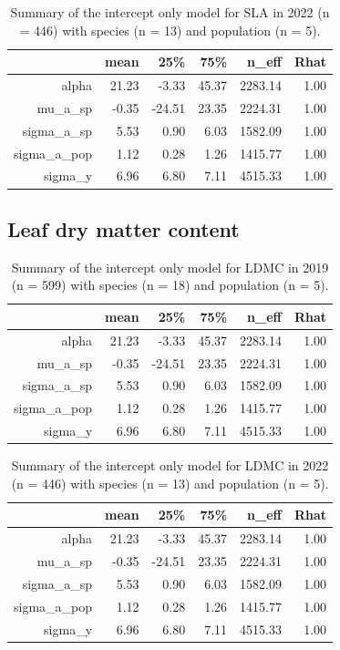 \documentclass{article}
\begin{document}
\begin{table}[ht]
\centering
\caption{Summary of the intercept only model for SLA in 2022 (n = 446) with species (n = 13) and population (n = 5).} 
\begin{tabular}{rrrrrr}
  \hline
 & mean & 25\% & 75\% & n\_eff & Rhat \\ 
  \hline
alpha & 21.23 & -3.33 & 45.37 & 2283.14 & 1.00 \\ 
  mu\_a\_sp & -0.35 & -24.51 & 23.35 & 2224.31 & 1.00 \\ 
  sigma\_a\_sp & 5.53 & 0.90 & 6.03 & 1582.09 & 1.00 \\ 
  sigma\_a\_pop & 1.12 & 0.28 & 1.26 & 1415.77 & 1.00 \\ 
  sigma\_y & 6.96 & 6.80 & 7.11 & 4515.33 & 1.00 \\ 
  \end{tabular}
\end{table}\newpage

\subsection*{Leaf dry matter content}
\begin{table}[ht]
\centering
\caption{Summary of the intercept only model for LDMC in 2019 (n = 599) with species (n = 18) and population (n = 5).} 
\begin{tabular}{rrrrrr}
  \hline
 & mean & 25\% & 75\% & n\_eff & Rhat \\ 
  \hline
alpha & 21.23 & -3.33 & 45.37 & 2283.14 & 1.00 \\ 
  mu\_a\_sp & -0.35 & -24.51 & 23.35 & 2224.31 & 1.00 \\ 
  sigma\_a\_sp & 5.53 & 0.90 & 6.03 & 1582.09 & 1.00 \\ 
  sigma\_a\_pop & 1.12 & 0.28 & 1.26 & 1415.77 & 1.00 \\ 
  sigma\_y & 6.96 & 6.80 & 7.11 & 4515.33 & 1.00 \\ 
  \end{tabular}
\end{table}
\begin{table}[ht]
\centering
\caption{Summary of the intercept only model for LDMC in 2022 (n = 446) with species (n = 13) and population (n = 5).} 
\begin{tabular}{rrrrrr}
  \hline
 & mean & 25\% & 75\% & n\_eff & Rhat \\ 
  \hline
alpha & 21.23 & -3.33 & 45.37 & 2283.14 & 1.00 \\ 
  mu\_a\_sp & -0.35 & -24.51 & 23.35 & 2224.31 & 1.00 \\ 
  sigma\_a\_sp & 5.53 & 0.90 & 6.03 & 1582.09 & 1.00 \\ 
  sigma\_a\_pop & 1.12 & 0.28 & 1.26 & 1415.77 & 1.00 \\ 
  sigma\_y & 6.96 & 6.80 & 7.11 & 4515.33 & 1.00 \\ 
  \end{tabular}
\end{table}\newpage
\end{document}
